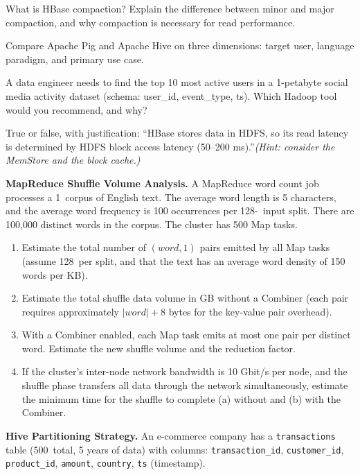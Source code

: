 \sq What is HBase compaction? Explain the difference between minor
and major compaction, and why compaction is necessary for read
performance.

\sq Compare Apache Pig and Apache Hive on three dimensions: target
user, language paradigm, and primary use case.

\sq A data engineer needs to find the top 10 most active users in a
1-petabyte social media activity dataset (schema: user\_id, event\_type,
ts). Which Hadoop tool would you recommend, and why?

\sq True or false, with justification: ``HBase stores data in HDFS,
so its read latency is determined by HDFS block access latency
(50--200 ms).''\quad\textit{(Hint: consider the MemStore and the
block cache.)}

\bigskip
{}

\ap \textbf{MapReduce Shuffle Volume Analysis.}
A MapReduce word count job processes a 1\TB\ corpus of English text.
The average word length is 5 characters, and the average word
frequency is 100 occurrences per 128-\MB\ input split. There are
100,000 distinct words in the corpus. The cluster has 500 Map tasks.

\begin{enumerate}[label=(\alph*)]
  \item Estimate the total number of $(word, 1)$ pairs emitted by all
        Map tasks (assume 128\MB\ per split, and that the text has an
        average word density of 150 words per KB).
  \item Estimate the total shuffle data volume in GB without a
        Combiner (each pair requires approximately $|word| + 8$ bytes
        for the key-value pair overhead).
  \item With a Combiner enabled, each Map task emits at most one
        pair per distinct word. Estimate the new shuffle volume and
        the reduction factor.
  \item If the cluster's inter-node network bandwidth is 10 Gbit/s
        per node, and the shuffle phase transfers all data through the
        network simultaneously, estimate the minimum time for the
        shuffle to complete (a) without and (b) with the Combiner.
\end{enumerate}

\ap \textbf{Hive Partitioning Strategy.}
An e-commerce company has a \texttt{transactions} table (500\TB\
total, 5 years of data) with columns: \texttt{transaction\_id},
\texttt{customer\_id}, \texttt{product\_id}, \texttt{amount},
\texttt{country}, \texttt{ts} (timestamp).

